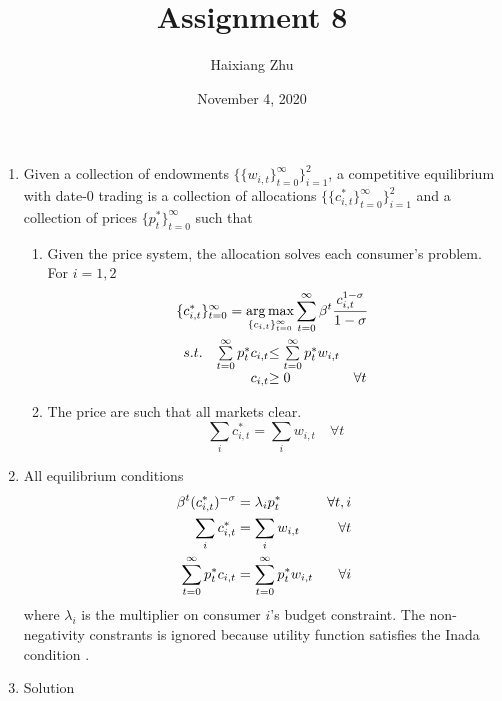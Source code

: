 \documentclass{article}
\title{Assignment 8}
\date{November 4, 2020}
\author{Haixiang Zhu}
\DeclareMathOperator*{\argmax}{arg\,max}
\begin{document}
    \maketitle
    \renewcommand{\arraystretch}{1.5}
    \begin{enumerate}
        \item Given a collection of endowments $\{\{w_{i,t}\}_{t=0}^\infty\}_{i=1}^2$, a competitive equilibrium with date-0 trading is a collection of allocations $\{\{c_{i,t}^\ast\}_{t=0}^\infty\}_{i=1}^2$ and a collection of prices $\{p_{t}^\ast\}_{t=0}^\infty$ such that
        \begin{enumerate}
            \item Given the price system, the allocation solves each consumer's problem. For $i=1,2$ 
            \begin{align*}
                &\{c_{i,t}^\ast\}_{t=0}^\infty=\argmax_{\{c_{i,t}\}_{t=0}^\infty}\sum_{t=0}^\infty\beta^t\frac{c_{i,t}^{1-\sigma}}{1-\sigma}\\
                &\begin{array}{r@{\quad}r@{}l@{\quad}l}
                s.t.&\sum\limits_{t=0}^\infty p_t^\ast c_{i,t}&\le\sum\limits_{t=0}^\infty p_t^\ast w_{i,t}\\
                &c_{i,t}&\ge0 &\forall t  
                \end{array} 
            \end{align*}
            \item The price are such that all markets clear. 
            \begin{equation*}
                \sum_i c_{i,t}^\ast=\sum_i w_{i,t}\quad\forall t 
            \end{equation*}
        \end{enumerate}
        \item All equilibrium conditions
        \begin{align}
            \beta^t (c_{i,t}^\ast)^{-\sigma}&=\lambda_ip_t^\ast&\forall t,i\label{c1}\\
            \sum_i c_{i,t}^\ast&=\sum_i w_{i,t}&\forall t\notag\\
            \sum_{t=0}^\infty p_t^\ast c_{i,t}&=\sum_{t=0}^\infty p_t^\ast w_{i,t}&\forall i\label{c2}
        \end{align}
        where $\lambda_i$ is the multiplier on consumer $i$'s budget constraint. The non-negativity constrants is ignored because utility function satisfies the Inada condition . 
        \item Solution\\

\end{enumerate}
\end{document}
